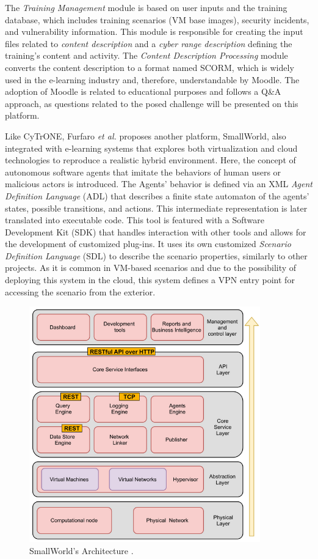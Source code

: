 The \textit{Training Management} module is based on user inputs and the training database, which includes training scenarios (VM base images), security incidents, and vulnerability information. This module is responsible for creating the input files related to \textit{content description} and a \textit{cyber range description} defining the training's content and activity. The \textit{Content Description Processing} module converts the content description to a format named SCORM, which is widely used in the e-learning industry and, therefore,  understandable by Moodle. The adoption of Moodle is related to educational purposes and follows a Q\&A approach, as questions related to the posed challenge will be presented on this platform.


Like CyTrONE, Furfaro \textit{et al.} \cite{cloud_based_platform_ref} proposes another platform, SmallWorld, also integrated with e-learning systems that explores both virtualization and cloud technologies to reproduce a realistic hybrid environment. Here, the concept of autonomous software agents that imitate the behaviors of human users or malicious actors is introduced. The Agents' behavior is defined via an XML \textit{Agent Definition Language} (ADL) that describes a finite state automaton of the agents' states, possible transitions, and actions. This intermediate representation is later translated into executable code. This tool is featured with a Software Development Kit (SDK) that handles interaction with other tools and allows for the development of customized plug-ins. It uses its own customized \textit{Scenario Definition Language} (SDL) to describe the scenario properties, similarly to other projects. As it is common in VM-based scenarios and due to the possibility of deploying this system in the cloud, this system defines a VPN entry point for accessing the scenario from the exterior.

\begin{figure}[H]
    \includegraphics[width=10cm]{figures/smallworld_architecture.png}
    \caption{SmallWorld's Architecture \cite{cloud_based_platform_ref}.}
    \label{fig:smallworld_architecture}
\end{figure}

